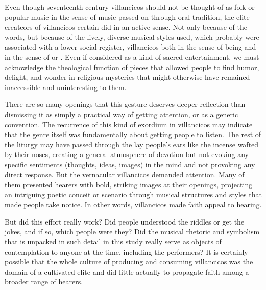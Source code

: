Even though seventeenth-century villancicos should not be thought of as folk or
popular music in the sense of music passed on through oral tradition, the elite
createors of villancicos certain did  in an active
sense.
Not only because of the words, but because of the lively, diverse musical
styles used, which probably were associated with a lower social register,
villancicos  both in the sense of being
 and in the sense of  or
.
Even if considered as a kind of sacred entertainment, we must acknowledge the
theological function of pieces that allowed people to find humor, delight, and
wonder in religious mysteries that might otherwise have remained inaccessible
and uninteresting to them.

There are so many  openings that this gesture deserves deeper
reflection than dismissing it as simply a practical way of getting attention,
or as a generic convention. 
The recurrence of this kind of exordium in villancicos may indicate that the
genre itself was fundamentally about getting people to listen.
The rest of the liturgy may have passed through the lay people's ears like the
incense wafted by their noses, creating a general atmosphere of devotion but
not evoking any specific sentiments (thoughts, ideas, images) in the mind and
not provoking any direct response.
But the vernacular villancicos demanded attention.
Many of them presented hearers with bold, striking images at their openings,
projecting an intriguing poetic conceit or scenario through musical structures
and styles that made people take notice. 
In other words, villancicos made faith appeal to hearing.

But did this effort really work?
Did people understood the riddles or get the jokes, and if so, which people
were they? 
Did the musical rhetoric and symbolism that is unpacked in such detail in this
study really serve as objects of contemplation to anyone at the time, including
the performers?
It is certainly possible that the whole culture of producing and consuming
villancicos was the domain of a cultivated elite and did little actually to
propagate faith among a broader range of hearers.

